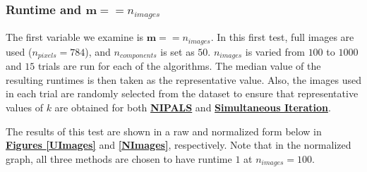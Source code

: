 \documentclass[12pt]{article}
\begin{document}
\subsubsection{Runtime and $\textbf{m} == n_{images}$}\label{5.1.2}

The first variable we examine is $\textbf{m} == n_{images}$. In this first test, full images are used ($n_{pixels}=784$), and $n_{components}$ is set as $50$. $n_{images}$ is varied from $100$ to $1000$ and $15$ trials are run for each of the algorithms. The median value of the resulting runtimes is then taken as the representative value. Also, the images used in each trial are randomly selected from the dataset to ensure that representative values of $k$ are obtained for both \textbf{\hyperref[3.1]{NIPALS}} and \textbf{\hyperref[3.3]{Simultaneous Iteration}}. 

The results of this test are shown in a raw and normalized form below in \textbf{\hyperref[UPixels]{Figures \ref*{UImages}}} and \textbf{\hyperref[NPixels]{\ref*{NImages}}}, respectively. Note that in the normalized graph, all three methods are chosen to have runtime $1$ at $n_{images} = 100$.
\end{document}
